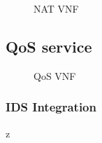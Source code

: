 \begin{figure}[!t]
  \centering
  \def\svgwidth{\linewidth}
  
  \caption{NAT VNF}
  \label{fig:nat_use}
\end{figure}




\subsection{QoS service}
\begin{figure}[!t]
  \centering
  \def\svgwidth{\linewidth}
  
  \caption{QoS VNF}
  \label{fig:qos_use}
\end{figure}
\subsubsection{IDS Integration}
z
